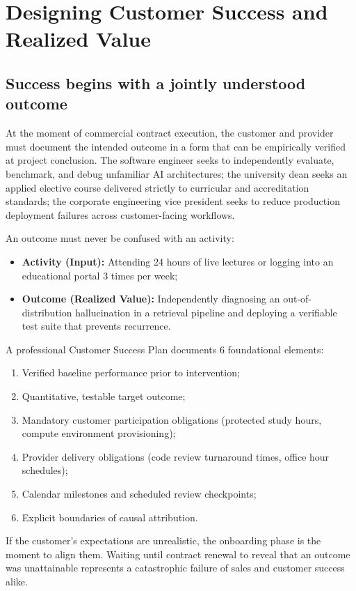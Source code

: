 \section{Designing Customer Success and Realized Value}

\subsection{Success begins with a jointly understood outcome}

At the moment of commercial contract execution, the customer and provider must document the intended outcome in a form that can be empirically verified at project conclusion. The software engineer seeks to independently evaluate, benchmark, and debug unfamiliar AI architectures; the university dean seeks an applied elective course delivered strictly to curricular and accreditation standards; the corporate engineering vice president seeks to reduce production deployment failures across customer-facing workflows.

An outcome must never be confused with an activity:
\begin{itemize}
\item \textbf{Activity (Input):} Attending 24 hours of live lectures or logging into an educational portal 3 times per week;
\item \textbf{Outcome (Realized Value):} Independently diagnosing an out-of-distribution hallucination in a retrieval pipeline and deploying a verifiable test suite that prevents recurrence.
\end{itemize}
A professional Customer Success Plan documents 6 foundational elements:
\begin{enumerate}
\item Verified baseline performance prior to intervention;
\item Quantitative, testable target outcome;
\item Mandatory customer participation obligations (protected study hours, compute environment provisioning);
\item Provider delivery obligations (code review turnaround times, office hour schedules);
\item Calendar milestones and scheduled review checkpoints;
\item Explicit boundaries of causal attribution.
\end{enumerate}
If the customer's expectations are unrealistic, the onboarding phase is the moment to align them. Waiting until contract renewal to reveal that an outcome was unattainable represents a catastrophic failure of sales and customer success alike.


